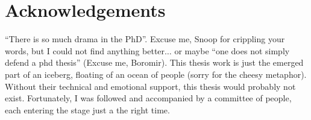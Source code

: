 \chapter*{Acknowledgements}

``There is so much drama in the PhD''.
Excuse me, Snoop for crippling your words, but I could not find anything better$\ldots$ or maybe ``one does not simply defend a phd thesis'' (Excuse me, Boromir).
This thesis work is just the emerged part of an iceberg, floating of an ocean of people (sorry for the cheesy metaphor).
Without their technical and emotional support, this thesis would probably not exist.
Fortunately, I was followed and accompanied by a committee of people, each entering the stage just a the right time.

